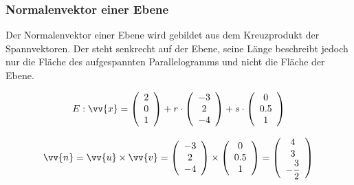 \documentclass[a4paper, 15pt]{article}
\begin{document}
\subsubsection{Normalenvektor einer Ebene}
Der Normalenvektor einer Ebene wird gebildet aus dem Kreuzprodukt der Spannvektoren. Der steht senkrecht auf der Ebene, seine Länge beschreibt jedoch nur die Fläche des aufgespannten Parallelogramms und nicht die Fläche der Ebene.\newline\newline
\begin{minipage}{.49\textwidth}
\begin{equation*}
E:\vv{x}=\left(\begin{array}{c} 2 \\ 0 \\ 1 \end{array}\right) + r \cdot \left(\begin{array}{c} -3 \\ 2 \\ -4 \end{array}\right) + s \cdot \left(\begin{array}{c} 0 \\ 0.5 \\ 1 \end{array}\right)
\end{equation*}
\end{minipage}
\begin{minipage}{.49\textwidth}
\begin{equation*}
\vv{n} = \vv{u} \times \vv{v} = \left(\begin{array}{c} -3 \\ 2 \\ -4 \end{array}\right) \times \left(\begin{array}{c} 0 \\ 0.5 \\ 1 \end{array}\right) = \left(\begin{array}{c} 4 \\ 3 \\ -\dfrac{3}{2} \end{array}\right)
\end{equation*}
\end{minipage}
\end{document}
